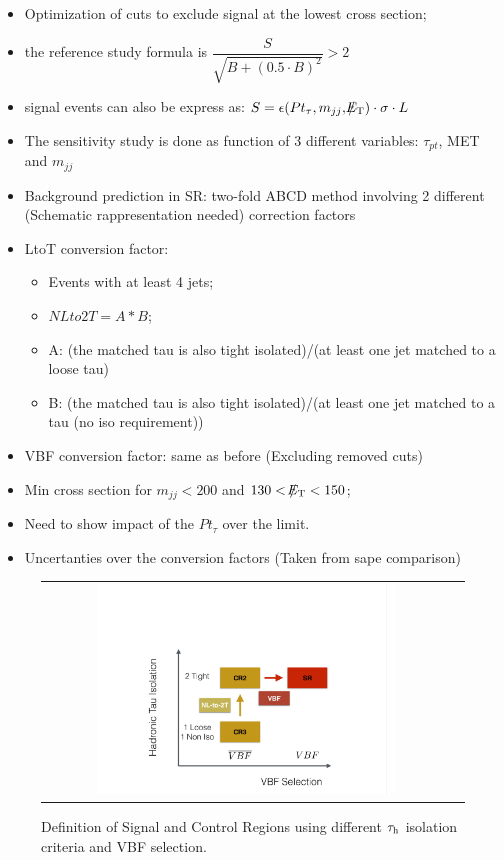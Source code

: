 \begin{itemize}
	\item Optimization of cuts to exclude signal at the lowest cross section;
	\item the reference study formula is $\dfrac{S}{\sqrt{B + (0.5 \cdot B)^{2}}} > 2$
	\item signal events can also be express as: $S = \epsilon ( Pt_{\tau} , m_{jj} ,  \slash\mkern-12mu{E}_{\text{T}} )\cdot \sigma \cdot L$
	\item The sensitivity study is done as function of 3 different variables: $\tau_{pt}$, MET and $m_{jj}$
	\item Background prediction in SR: two-fold ABCD method involving 2 different (Schematic rappresentation needed) correction factors
	\item LtoT conversion factor:
	\begin{itemize}
		\item Events with at least 4 jets;
		\item $NLto2T = A * B$;
		\item A: (the matched tau is also tight isolated)/(at least one jet matched to a loose tau)
		\item B: (the matched tau is also tight isolated)/(at least one jet matched to a tau (no iso requirement))
	\end{itemize}
		\item VBF conversion factor: same as before (Excluding removed cuts)
		\item Min cross section for $m_{jj} < 200$ and $130 < \slash\mkern-12mu{E}_{\text{T}} < 150$;
		\item Need to show impact of the $Pt_{\tau}$ over the limit.
		\item Uncertanties over the conversion factors (Taken from sape comparison)
\end{itemize}

\begin{figure}[tbh!]
	\centering
	\begin{tabular}{cc}
		\includegraphics[width=0.75\textwidth]{PLOTS/diTauHadLSotherPlots/controlregions13TeV.pdf}
	\end{tabular}
	\caption{Definition of Signal and Control Regions using different $\tau_{\text{h}}$ isolation criteria and VBF selection.}
	\label{fig:crs_13tev}
\end{figure}

